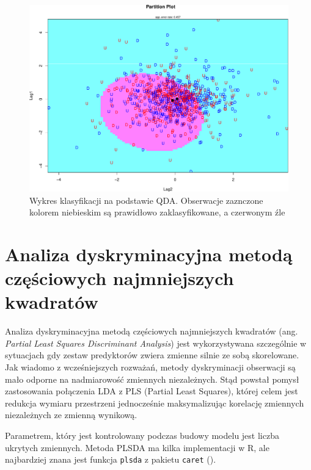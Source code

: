\documentclass[
]{book}
\theoremstyle{plain}
\theoremstyle{definition}
\theoremstyle{definition}
\theoremstyle{definition}
\theoremstyle{definition}
\theoremstyle{definition}
\theoremstyle{remark}
\begin{document}
\begin{figure}

{\centering \includegraphics{EksploracjaDanych_files/figure-latex/qda-1} 

}

\caption{Wykres klasyfikacji na podstawie QDA. Obserwacje zaznczone kolorem niebieskim są prawidłowo zaklasyfikowane, a czerwonym źle}\label{fig:qda}
\end{figure}

\section{Analiza dyskryminacyjna metodą częściowych najmniejszych kwadratów}\label{analiza-dyskryminacyjna-metodux105-czux119ux15bciowych-najmniejszych-kwadratuxf3w}

Analiza dyskryminacyjna metodą częściowych najmniejszych kwadratów (ang. \emph{Partial Least Squares Discriminant Analysis}) jest wykorzystywana szczególnie w sytuacjach gdy zestaw predyktorów zwiera zmienne silnie ze sobą skorelowane. Jak wiadomo z wcześniejszych rozważań, metody dyskryminacji obserwacji są mało odporne na nadmiarowość zmiennych niezależnych. Stąd powstał pomysł zastosowania połączenia LDA z PLS (Partial Least Squares), której celem jest redukcja wymiaru przestrzeni jednocześnie maksymalizując korelację zmiennych niezależnych ze zmienną wynikową.

Parametrem, który jest kontrolowany podczas budowy modelu jest liczba ukrytych zmiennych. Metoda PLSDA ma kilka implementacji w R, ale najbardziej znana jest funkcja \texttt{plsda} z pakietu \texttt{caret} ().
\end{document}
